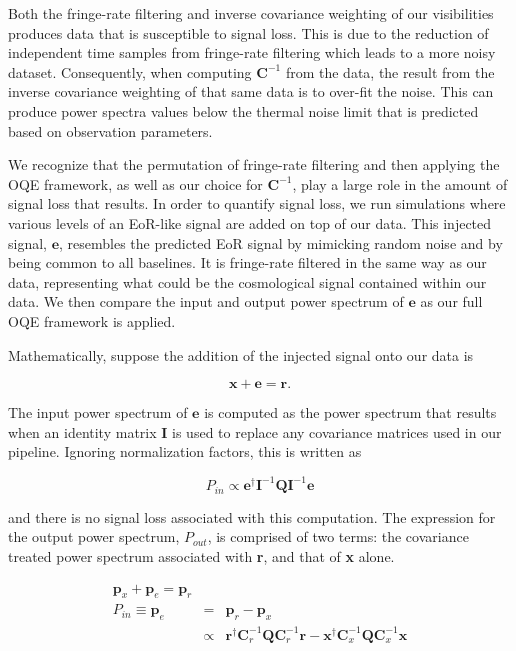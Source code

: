 \documentclass[preprint2,numberedappendix,tighten,twocolappendix]{aastex6}  %
\begin{document}
Both the fringe-rate filtering and inverse covariance weighting of our visibilities produces data that is susceptible to signal loss. This is due to the reduction of independent time samples from fringe-rate filtering which leads to a more noisy dataset. Consequently, when computing $\textbf{C}^{-1}$ from the data, the result from the inverse covariance weighting of that same data is to over-fit the noise. This can produce power spectra values below the thermal noise limit that is predicted based on observation parameters. 

We recognize that the permutation of fringe-rate filtering and then applying the OQE framework, as well as our choice for $\textbf{C}^{-1}$, play a large role in the amount of signal loss that results. In order to quantify signal loss, we run simulations where various levels of an EoR-like signal are added on top of our data. This injected signal, $\textbf{e}$, resembles the predicted EoR signal by mimicking random noise and by being common to all baselines. It is fringe-rate filtered in the same way as our data, representing what could be the cosmological signal contained within our data. We then compare the input and output power spectrum of $\textbf{e}$ as our full OQE framework is applied.

Mathematically, suppose the addition of the injected signal onto our data is

\begin{equation}
\textbf{x} + \textbf{e} = \textbf{r}.
\end{equation}

The input power spectrum of $\textbf{e}$ is computed as the power spectrum that results when an identity matrix \textbf{I} is used to replace any covariance matrices used in our pipeline. Ignoring normalization factors, this is written as

\begin{equation}
P_{in} \propto \textbf{e}^{\dagger}\textbf{I}^{-1}\textbf{Q}\textbf{I}^{-1}\textbf{e}
\end{equation}

\noindent and there is no signal loss associated with this computation. The expression for the output power spectrum, $P_{out}$, is comprised of two terms: the covariance treated power spectrum associated with \textbf{r}, and that of \textbf{x} alone. 

\begin{eqnarray}
\label{eq:sigloss}
\textbf{p}_{x} + \textbf{p}_{e} = \textbf{p}_{r} \\
P_{in} \equiv \textbf{p}_{e} &=& \textbf{p}_{r}-\textbf{p}_{x} \nonumber \\
&\propto& \textbf{r}^{\dagger}\textbf{C}_{r}^{-1}\textbf{Q}\textbf{C}_{r}^{-1}\textbf{r} - \textbf{x}^{\dagger}\textbf{C}_{x}^{-1}\textbf{Q}\textbf{C}_{x}^{-1}\textbf{x} \nonumber
\end{eqnarray}
\end{document}
